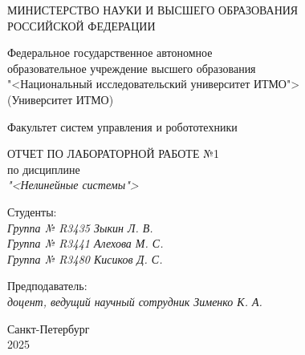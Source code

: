 \thispagestyle{empty}

\begin{center}
    МИНИСТЕРСТВО НАУКИ И ВЫСШЕГО ОБРАЗОВАНИЯ \\ РОССИЙСКОЙ ФЕДЕРАЦИИ

    \vspace{20pt}

    Федеральное государственное автономное \\ образовательное учреждение высшего образования \\
    "<Национальный исследовательский университет ИТМО"> \\
    (Университет ИТМО)

    \vspace{20pt}

    Факультет систем управления и робототехники
\end{center}

\vfill

\begin{center}
    ОТЧЕТ ПО ЛАБОРАТОРНОЙ РАБОТЕ №1\\  
    по дисциплине \\
    \textit{"<Нелинейные системы">}

    \vspace{20pt}

\end{center}

\vfill

    \noindent Студенты: \\
    \textit{Группа № R3435 \hfill Зыкин Л. В.} \\
    \textit{Группа № R3441 \hfill Алехова М. С.} \\
    \textit{Группа № R3480 \hfill Кисиков Д. С.} \\

    \vspace{20pt}

    \noindent Предподаватель: \\
    \textit{доцент, ведущий научный сотрудник \hfill Зименко К. А.}

\vfill

\begin{center}
    Санкт-Петербург \\ 2025
\end{center}